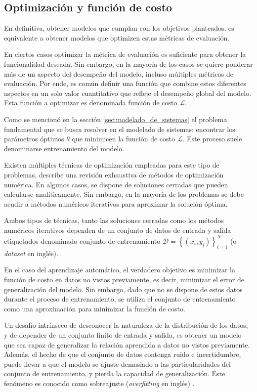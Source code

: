 \subsection{Optimización y función de costo}
\label{sec:funcion_de_costo}
En definitiva, obtener modelos que cumplan con los objetivos planteados, es equivalente a obtener modelos que optimizen estas métricas de evaluación.

En ciertos casos optimizar la métrica de evaluación es suficiente para obtener la funcionalidad deseada. Sin embargo, en la mayoría de los casos se quiere ponderar más de un aspecto del desempeño del modelo, incluso múltiples métricas de evaluación. Por ende, es común definir una función que combine estos diferentes aspectos en un solo valor cuantitativo que refleje el desempeño global del modelo. Esta función a optimizar es denominada función de costo $\mathcal{L}$.

Como se mencionó en la sección \ref{sec:modelado_de_sistemas} el problema fundamental que se busca resolver en el modelado de sistemas: encontrar los parámetros óptimos $\theta$ que minimicen la función de costo $\mathcal{L}$. Este proceso suele denominarse entrenamiento del modelo.

Existen múltiples técnicas de optimización empleadas para este tipo de problemas, \cite{Nocedal2006} describe una revisión exhaustiva de métodos de optimización numérica. En algunos casos, se dispone de soluciones cerradas que pueden calcularse analíticamente. Sin embargo, en la mayoría de los problemas se debe acudir a métodos numéricos iterativos para aproximar la solución óptima.

Ambos tipos de técnicas, tanto las soluciones cerradas como los métodos numéricos iterativos dependen de un conjunto de datos de entrada y salida etiquetados denominado conjunto de entrenamiento $\mathcal{D} = \left\{(x_i, y_i)\right\}_{i=1}^{N}$ (o \textit{dataset} en inglés).

En el caso del aprendizaje automático, el verdadero objetivo es minimizar la función de costo en datos no vistos previamente, es decir, minimizar el error de generalización del modelo. Sin embargo, dado que no se dispone de estos datos durante el proceso de entrenamiento, se utiliza el conjunto de entrenamiento como una aproximación para minimizar la función de costo.

Un desafío intrínseco de desconocer la naturaleza de la distribución de los datos, y de depender de un conjunto finito de entrada y salida, es obtener un modelo que sea capaz de generalizar la relación aprendida a datos no vistos previamente. Además, el hecho de que el conjunto de datos contenga ruido e incertidumbre, puede llevar a que el modelo se ajuste demasiado a las particularidades del conjunto de entrenamiento, y pierda la capacidad de generalización. Este fenómeno es conocido como sobreajuste (\textit{overfitting} en inglés) \cite{Bishop2006}.

